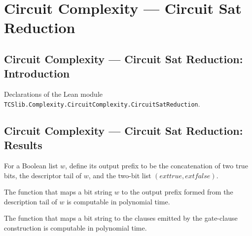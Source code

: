 \section{Circuit Complexity --- Circuit Sat Reduction}
\subsection*{Circuit Complexity --- Circuit Sat Reduction: Introduction}

Declarations of the Lean module \texttt{TCSlib.Complexity.CircuitComplexity.CircuitSatReduction}.

\subsection*{Circuit Complexity --- Circuit Sat Reduction: Results}

\begin{definition}
\label{BoolCircuit.CktSatReduction.outPrefix}
\leanok
{}
For a Boolean list $w$, define its output prefix to be the concatenation of two true
bits, the descriptor tail of $w$, and the two-bit list $(	ext{true},	ext{false})$.
\end{definition}

\begin{theorem}
\label{BoolCircuit.CktSatReduction.polyTimeComputable_outPrefix}
\leanok
{}
The function that maps a bit string $w$ to the output prefix formed from the description
tail of $w$ is computable in polynomial time.
\end{theorem}

\begin{theorem}
\label{BoolCircuit.CktSatReduction.polyTimeComputable_gateClauses}
\leanok
{}
The function that maps a bit string to the clauses emitted by the gate-clause
construction is computable in polynomial time.
\end{theorem}

